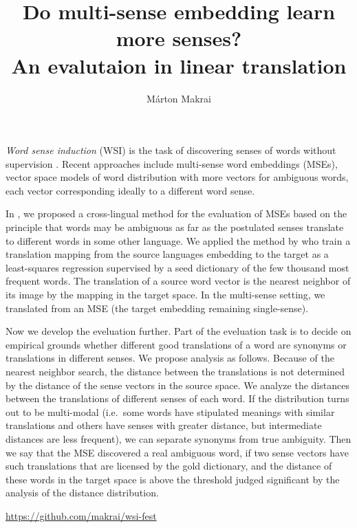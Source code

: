 \documentclass[11pt]{article}
\title{Do multi-sense embedding learn more senses? \\ An evalutaion in linear
translation}
\author{
  Márton Makrai \\
}
\date{}
\begin{document}
\maketitle

\hspace{2cm}


\emph{Word sense induction} (WSI) is the task of discovering senses of words
without supervision \citep{Schutze:1998}. Recent approaches include multi-sense
word embeddings (MSEs), vector space models of word distribution with more
vectors for ambiguous words, each vector corresponding ideally to a different
word sense.  

In \cite{Borbely:2016}, we proposed a cross-lingual method for the evaluation
of MSEs based on the principle that words may be ambiguous as far as the
postulated senses translate to different words in some other language.  We
applied the method by \citet{Mikolov:2013x} who train a translation mapping
from the source languages embedding to the target as a least-squares regression
supervised by a seed dictionary of the  few thousand most frequent words. The
translation of a source word vector is the nearest neighbor of its image by the
mapping in the target space. In the multi-sense setting, we translated from an
MSE (the target embedding remaining single-sense).  

Now we develop the eveluation further. Part of the eveluation task is to decide
on empirical grounds whether different good translations of a word are synonyms
or translations in different senses.  We propose analysis as follows.  Because
of the nearest neighbor search, the distance between the translations is not
determined by the distance of the sense vectors in the source space.  We
analyze the distances between the translations of different senses of each
word. If the distribution turns out to be multi-modal (i.e.~some words have
stipulated meanings with similar translations and others have senses with
greater distance, but intermediate distances are less frequent), we can
separate synonyms from true ambiguity. Then we say that the MSE discovered a
real ambiguous word, if two sense vectors have such translations that are
licensed by the gold dictionary, and the distance of these words in the target
space is above the threshold judged significant by the analysis of the distance
distribution.  

\url{https://github.com/makrai/wsi-fest}
\end{document}
